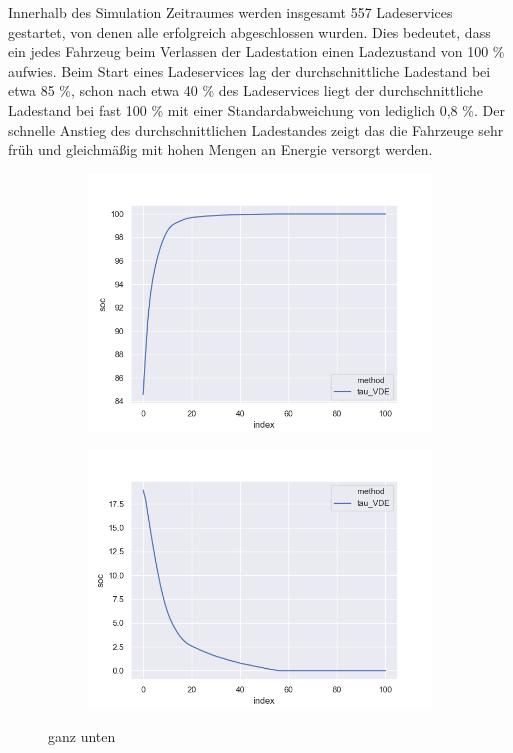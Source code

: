 Innerhalb des Simulation Zeitraumes werden insgesamt 557 Ladeservices gestartet, von denen alle erfolgreich abgeschlossen wurden. Dies bedeutet, dass ein jedes Fahrzeug beim Verlassen der Ladestation einen Ladezustand von 100 \% aufwies. Beim Start eines Ladeservices lag der durchschnittliche Ladestand bei etwa 85 \%, schon nach etwa 40 \% des Ladeservices liegt der durchschnittliche Ladestand bei fast 100 \% mit einer Standardabweichung von lediglich 0,8 \%. Der schnelle Anstieg des durchschnittlichen Ladestandes zeigt das die Fahrzeuge sehr früh und gleichmäßig mit hohen Mengen an Energie versorgt werden. \\
\begin{figure}
	\begin{subfigure}{0.49\linewidth}
		\includegraphics[width=\linewidth]{img/VDE_tau/tau_VDE_2_soc_mean.png}
        \label{ABB_VDEtauSocMEAN}
	\end{subfigure}
	\begin{subfigure}{0.49\linewidth}
		\includegraphics[width=\linewidth]{img/VDE_tau/tau_VDE_2_soc_std.png}
        \label{ABB_VDEtauSocSTD}
	\end{subfigure}
	\caption{ganz unten}
\end{figure}

